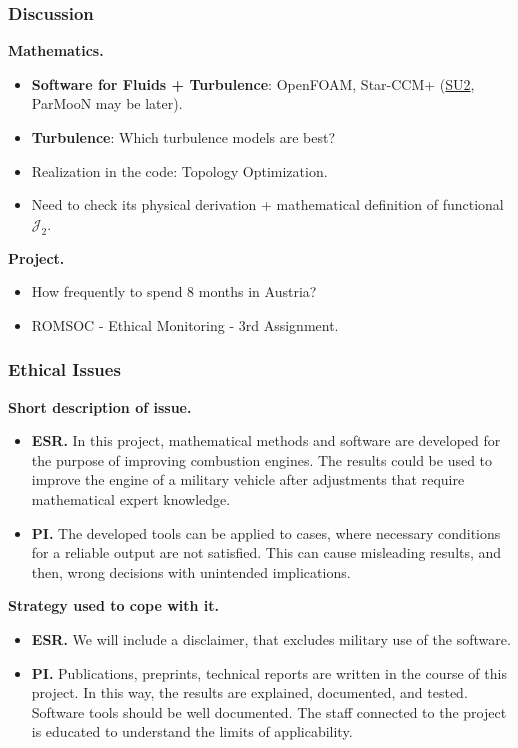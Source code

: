 \documentclass[t,xcolor=table,english]{beamer}   %
\begin{document}
\begin{frame}
	\frametitle{Discussion}
	\textbf{Mathematics.}
	\begin{itemize}
		\item \textbf{Software for Fluids + Turbulence}: {\color{red} OpenFOAM}, Star-CCM+ (\href{https://su2code.github.io/}{SU2}, ParMooN may be later).
		\item \textbf{Turbulence}: Which turbulence models are best?
		\item Realization in the code: Topology Optimization.
		\item Need to check its physical derivation + mathematical definition of functional $\mathcal{J}_2$.
	\end{itemize}
	\textbf{Project.}
	\begin{itemize}
		\item How frequently to spend 8 months in Austria?
		\item ROMSOC - Ethical Monitoring - 3rd Assignment.
	\end{itemize}
\end{frame}

\begin{frame}
    \frametitle{Ethical Issues}
    \textbf{\color{blue} Short description of issue.}
    \begin{itemize}
        \item \textbf{ESR.} In this project, mathematical methods and software are developed for the purpose of improving combustion engines. The results could be used to improve the engine of a military vehicle after adjustments that require mathematical expert knowledge.
        \item \textbf{PI.} The developed tools can be applied to cases, where necessary conditions for a reliable output are not satisfied. This can cause misleading results, and then, wrong decisions with unintended implications.
    \end{itemize}
    \textbf{\color{blue} Strategy used to cope with it.}
    \begin{itemize}
        \item \textbf{ESR.} We will include a disclaimer, that excludes military use of the software.
        \item \textbf{PI.} Publications, preprints, technical reports are written in the course of this project. In this way, the results are explained, documented, and tested. Software tools should be well documented. The staff connected to the project is educated to understand the limits of applicability.
    \end{itemize}
\end{frame}
\end{document}
